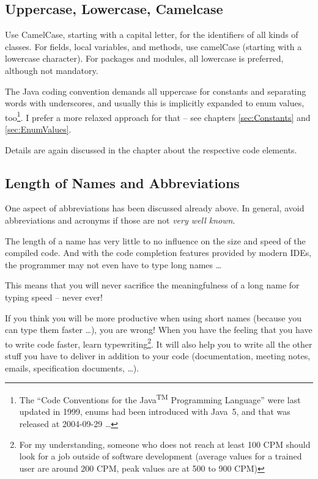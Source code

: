 \documentclass[12pt,a4paper,titlepage, parskip=half, headsepline, footsepline, cleardoubleplain]{scrbook}
\begin{document}
\subsection{Uppercase, Lowercase, Camelcase}
Use CamelCase, starting with a capital letter, for the identifiers of all kinds of classes. For fields, local variables, and methods, use camelCase (starting with a lowercase character). For packages and modules, all lowercase is preferred, although not mandatory.

The Java coding convention \autocite{SUN_CODE_CONVENTIONS} demands all uppercase for constants and separating words with underscores, and usually this is implicitly expanded to enum values, too\footnote{The “Code Conventions for the Java\textsuperscript{TM} Programming Language” \autocite{SUN_CODE_CONVENTIONS} were last updated in 1999, enums had been introduced with Java~5, and that was released at 2004-09-29 …}. I prefer a more relaxed approach for that – see chapters \vref{sec:Constants} and \vref{sec:EnumValues}.

Details are again discussed in the chapter about the respective code elements.

\subsection{Length of Names and Abbreviations}
One aspect of abbreviations has been discussed already above. In general, avoid abbreviations and acronyms if those are not \textit{very well known}.

The length of a name has very little to no influence on the size and speed of the compiled code. And with the code completion features provided by modern IDEs, the programmer may not even have to type long names …

This means that you will never sacrifice the meaningfulness of a long name for typing speed – never ever!

If you think you will be more productive when using short names (because you can type them faster …), you are wrong! When you have the feeling that you have to write code faster, learn typewriting\footnote{For my understanding, someone who does not reach at least 100 CPM should look for a job outside of software development (average values for a trained user are around 200 CPM, peak values are at 500 to 900 CPM)}. It will also help you to write all the other stuff you have to deliver in addition to your code (documentation, meeting notes, emails, specification documents, …).
\end{document}
